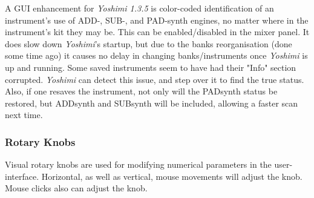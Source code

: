   A GUI enhancement for \textsl{Yoshimi 1.3.5} is color-coded identification
   of an instrument's use of ADD-, SUB-, and PAD-synth engines, no matter where
   in the instrument's kit they may be. This can be enabled/disabled in the
   mixer panel. It does slow down \textsl{Yoshimi}'s startup, but due to the
   banks reorganisation (done some time ago) it causes no delay in changing
   banks/instruments once \textsl{Yoshimi} is up and running.  Some saved
   instruments seem to have had their "Info" section corrupted.
   \textsl{Yoshimi} can detect this issue, and step over it to find the true
   status. Also, if one resaves the instrument, not only will the PADsynth
   status be restored, but ADDsynth and SUBsynth will be included, allowing a
   faster scan next time.

\subsubsection{Rotary Knobs}
\label{subsubsec:stock_settings_elements_knobs}

   Visual rotary knobs are used for modifying numerical parameters in the
   user-interface.
   Horizontal, as well as vertical, mouse movements will adjust the knob.
   Mouse clicks also can adjust the knob.

